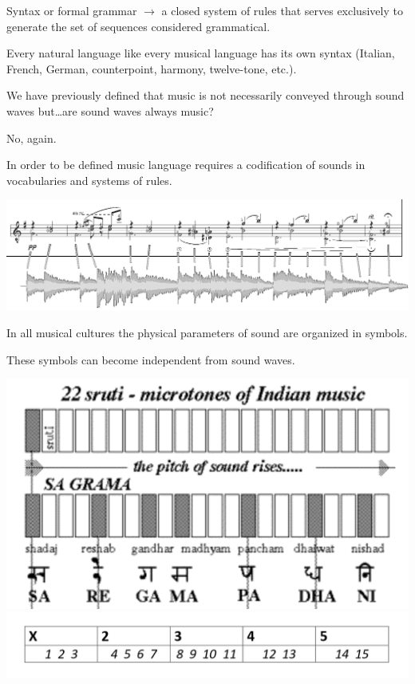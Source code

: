 Syntax or formal grammar \(\rightarrow\) a closed system of rules that serves exclusively to generate the set of sequences considered grammatical.

Every natural language like every musical language has its own syntax (Italian, French, German, counterpoint, harmony, twelve-tone, etc.).

We have previously defined that music is not necessarily conveyed through sound waves but\ldots are sound waves always music?

No, again.

In order to be defined music language requires a codification of sounds in vocabularies and systems of rules.

\begin{center}
\includegraphics[scale=0.9]{../img/ondenote.png}
\end{center}

In all musical cultures the physical parameters of sound are organized in symbols.

These symbols can become independent from sound waves.

\begin{center}
\includegraphics[scale=0.4]{../img/india.png}\break
\includegraphics[scale=0.3]{../img/rtmoindia.png}
\end{center}

